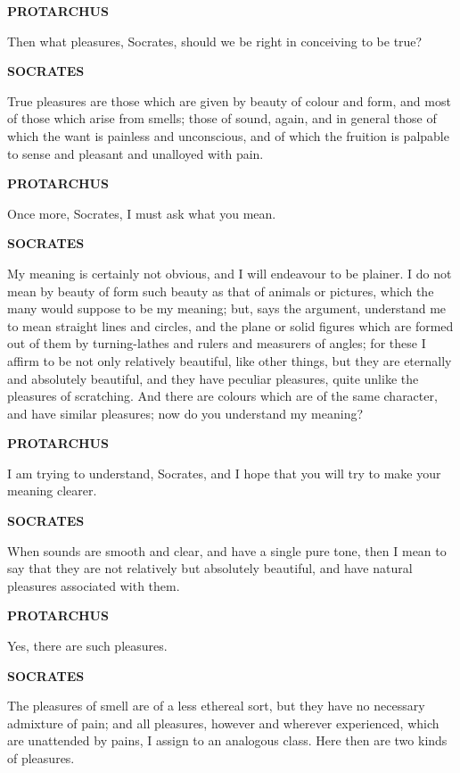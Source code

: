 \documentclass[11pt,letter]{article}
\begin{document}
\par \textbf{PROTARCHUS}
\par   Then what pleasures, Socrates, should we be right in conceiving to be true?

\par \textbf{SOCRATES}
\par   True pleasures are those which are given by beauty of colour and form, and most of those which arise from smells; those of sound, again, and in general those of which the want is painless and unconscious, and of which the fruition is palpable to sense and pleasant and unalloyed with pain.

\par \textbf{PROTARCHUS}
\par   Once more, Socrates, I must ask what you mean.

\par \textbf{SOCRATES}
\par   My meaning is certainly not obvious, and I will endeavour to be plainer. I do not mean by beauty of form such beauty as that of animals or pictures, which the many would suppose to be my meaning; but, says the argument, understand me to mean straight lines and circles, and the plane or solid figures which are formed out of them by turning-lathes and rulers and measurers of angles; for these I affirm to be not only relatively beautiful, like other things, but they are eternally and absolutely beautiful, and they have peculiar pleasures, quite unlike the pleasures of scratching. And there are colours which are of the same character, and have similar pleasures; now do you understand my meaning?

\par \textbf{PROTARCHUS}
\par   I am trying to understand, Socrates, and I hope that you will try to make your meaning clearer.

\par \textbf{SOCRATES}
\par   When sounds are smooth and clear, and have a single pure tone, then I mean to say that they are not relatively but absolutely beautiful, and have natural pleasures associated with them.

\par \textbf{PROTARCHUS}
\par   Yes, there are such pleasures.

\par \textbf{SOCRATES}
\par   The pleasures of smell are of a less ethereal sort, but they have no necessary admixture of pain; and all pleasures, however and wherever experienced, which are unattended by pains, I assign to an analogous class. Here then are two kinds of pleasures.
\end{document}
